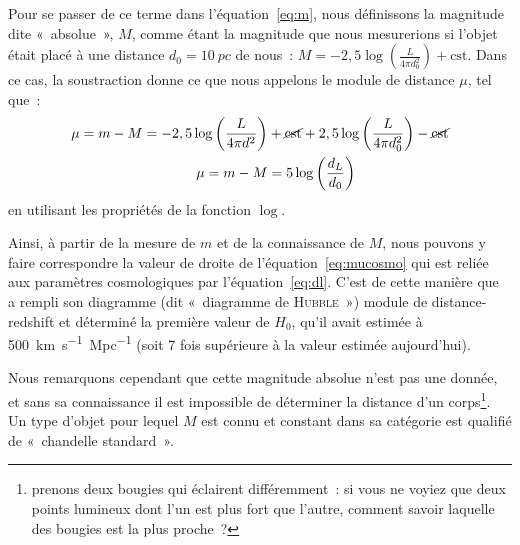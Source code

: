 \documentclass[../main/main.tex]{subfiles}
\begin{document}
Pour se passer de ce terme dans l'équation~\ref{eq:m}, nous définissons la
magnitude dite «~absolue~», $M$, comme étant la magnitude que nous mesurerions
si l'objet était placé à une distance $d_0 = \SI{10}{pc}$ de nous~: $M =
-2,5\log \left( \frac{L}{4\pi d_0^2} \right) + \text{cst}$. Dans ce cas, la
soustraction donne ce que nous appelons le module de distance $\mu$, tel que~:
\begin{align}\label{eq:mucosmo}
    \mu = m - M = -2,5\log \left( \frac{L}{4\pi d^2} \right) & +
    \cancel{\text{cst}} + 2,5\log \left( \frac{L}{4\pi d_0^2} \right) -
    \cancel{\text{cst}}\nonumber\\
    \mu = m-M & = 5\log \left( \frac{d_L}{d_0} \right)
\end{align}
en utilisant les propriétés de la fonction $\log$.

Ainsi, à partir de la mesure de $m$ et de la connaissance de $M$, nous pouvons y
faire correspondre la valeur de droite de l'équation~\ref{eq:mucosmo} qui est
reliée aux paramètres cosmologiques par l'équation~\ref{eq:dl}. C'est de cette
manière que~\cite{hubble1929} a rempli son diagramme (dit «~diagramme de
\textsc{Hubble}~») module de distance-redshift et déterminé la première valeur
de $H_0$, qu'il avait estimée à \SI{500}{km.s^{-1}.Mpc^{-1}} (soit 7 fois
supérieure à la valeur estimée aujourd'hui).

Nous remarquons cependant que cette magnitude absolue n'est pas une donnée, et
sans sa connaissance il est impossible de déterminer la distance d'un
corps\footnote{prenons deux bougies qui éclairent différemment~: si vous ne
    voyiez que deux points lumineux dont l'un est plus fort que l'autre, comment
savoir laquelle des bougies est la plus proche~?}. Un type d'objet pour lequel
$M$ est connu et constant dans sa catégorie est qualifié de «~chandelle
standard~».
\end{document}
